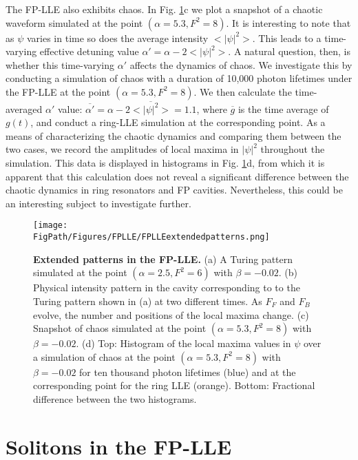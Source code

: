 The FP-LLE also exhibits chaos. In Fig. \ref{fig:FPLLEextendedpatterns}c we plot a snapshot of a chaotic waveform simulated at the point $(\alpha=5.3, F^2=8)$. It is interesting to note that as $\psi$ varies in time so does the average intensity $<|\psi|^2>$. This leads to a time-varying effective detuning value $\alpha'=\alpha-2<|\psi|^2>$. A natural question, then, is whether this time-varying $\alpha'$ affects the dynamics of chaos. We investigate this by conducting a simulation of chaos with a duration of 10,000 photon lifetimes under the FP-LLE at the point $(\alpha=5.3, F^2=8)$. We then calculate the time-averaged $\alpha'$ value: $\overline{\alpha'}=\alpha-2\overline{<|\psi|^2>}=1.1$, where $\overline{g}$ is the time average of $g(t)$, and conduct a ring-LLE simulation at the corresponding point. As a means of characterizing the chaotic dynamics and comparing them between the two cases, we record the amplitudes of local maxima in $|\psi|^2$ throughout the simulation. This data is displayed in histograms in Fig. \ref{fig:FPLLEextendedpatterns}d, from which it is apparent that this calculation does not reveal a significant difference between the chaotic dynamics in ring resonators and FP cavities. Nevertheless, this could be an interesting subject to investigate further. 


\begin{figure}[htpb]
	\begin{center}
		\texttt{[image: \\FigPath/Figures/FPLLE/FPLLEextendedpatterns.png]}
	\end{center}
	\caption[Extended patterns in the FP-LLE]{\textbf{Extended patterns in the FP-LLE.} (a) A Turing pattern simulated at the point $(\alpha=2.5,F^2=6)$ with $\beta=-0.02$. (b) Physical intensity pattern in the cavity corresponding to to the Turing pattern shown in (a) at two different times. As $F_F$ and $F_B$ evolve, the number and positions of the local maxima change. (c) Snapshot of chaos simulated at the point $(\alpha=5.3,F^2=8)$ with $\beta=-0.02$. (d) Top: Histogram of the local maxima values in $\psi$ over a simulation of chaos at the point $(\alpha=5.3,F^2=8)$ with $\beta=-0.02$ for ten thousand photon lifetimes (blue) and at the corresponding point for the ring LLE (orange). Bottom: Fractional difference between the two histograms.}
	\label{fig:FPLLEextendedpatterns}
\end{figure} 

\section{Solitons in the FP-LLE}


